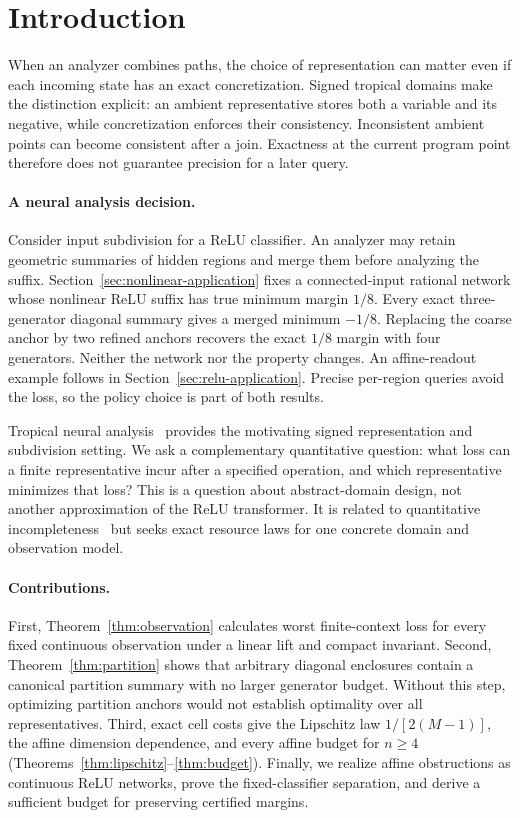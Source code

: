 \section{Introduction}
When an analyzer combines paths, the choice of representation can matter even if each incoming state has an exact concretization. Signed tropical domains make the distinction explicit: an ambient representative stores both a variable and its negative, while concretization enforces their consistency. Inconsistent ambient points can become consistent after a join. Exactness at the current program point therefore does not guarantee precision for a later query.

\paragraph{A neural analysis decision.}
Consider input subdivision for a ReLU classifier. An analyzer may retain geometric summaries of hidden regions and merge them before analyzing the suffix. Section~\ref{sec:nonlinear-application} fixes a connected-input rational network whose nonlinear ReLU suffix has true minimum margin $1/8$. Every exact three-generator diagonal summary gives a merged minimum $-1/8$. Replacing the coarse anchor by two refined anchors recovers the exact $1/8$ margin with four generators. Neither the network nor the property changes. An affine-readout example follows in Section~\ref{sec:relu-application}. Precise per-region queries avoid the loss, so the policy choice is part of both results.

Tropical neural analysis~\cite{goubault2021} provides the motivating signed representation and subdivision setting. We ask a complementary quantitative question: what loss can a finite representative incur after a specified operation, and which representative minimizes that loss? This is a question about abstract-domain design, not another approximation of the ReLU transformer. It is related to quantitative incompleteness~\cite{campion2023} but seeks exact resource laws for one concrete domain and observation model.

\paragraph{Contributions.}
First, Theorem~\ref{thm:observation} calculates worst finite-context loss for every fixed continuous observation under a linear lift and compact invariant. Second, Theorem~\ref{thm:partition} shows that arbitrary diagonal enclosures contain a canonical partition summary with no larger generator budget. Without this step, optimizing partition anchors would not establish optimality over all representatives. Third, exact cell costs give the Lipschitz law $1/[2(M-1)]$, the affine dimension dependence, and every affine budget for $n\ge4$ (Theorems~\ref{thm:lipschitz}--\ref{thm:budget}). Finally, we realize affine obstructions as continuous ReLU networks, prove the fixed-classifier separation, and derive a sufficient budget for preserving certified margins.


